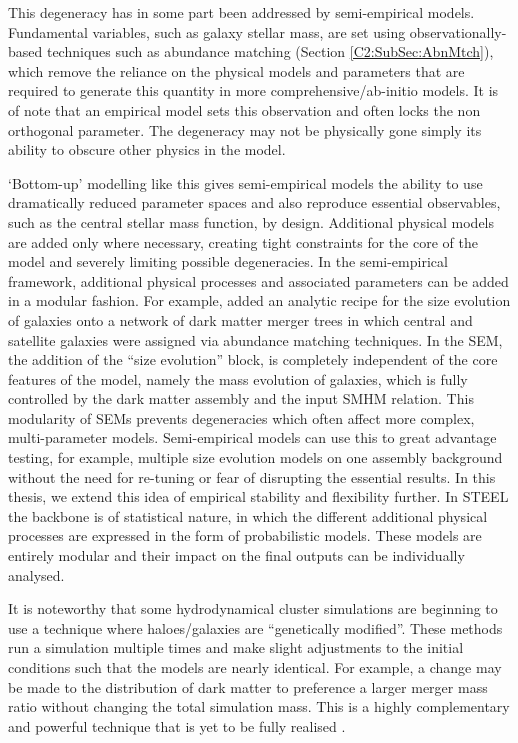 This degeneracy has in some part been addressed by semi-empirical models. Fundamental variables, such as galaxy stellar mass, are set using observationally-based techniques such as abundance matching (Section \ref{C2:SubSec:AbnMtch}), which remove the reliance on the physical models and parameters that are required to generate this quantity in more comprehensive/ab-initio models. It is of note that an empirical model sets this observation and often locks the non orthogonal parameter. The degeneracy may not be physically gone simply its ability to obscure other physics in the model.

`Bottom-up' modelling like this gives semi-empirical models the ability to use dramatically reduced parameter spaces and also reproduce essential observables, such as the central stellar mass function, by design. Additional physical models are added only where necessary, creating tight constraints for the core of the model and severely limiting possible degeneracies. In the semi-empirical framework, additional physical processes and associated parameters can be added in a modular fashion. For example, \citet{Shankar2014} added an analytic recipe for the size evolution of galaxies onto a network of dark matter merger trees in which central and satellite galaxies were assigned via abundance matching techniques. In the \citet{Shankar2014} SEM, the addition of the ``size evolution'' block, is completely independent of the core features of the model, namely the mass evolution of galaxies, which is fully controlled by the dark matter assembly and the input SMHM relation. This modularity of SEMs prevents degeneracies which often affect more complex, multi-parameter models. Semi-empirical models can use this to great advantage testing, for example, multiple size evolution models on one assembly background without the need for re-tuning or fear of disrupting the essential results. In this thesis, we extend this idea of empirical stability and flexibility further. In STEEL the backbone is of statistical nature, in which the different additional physical processes are expressed in the form of probabilistic models. These models are entirely modular and their impact on the final outputs can be individually analysed. 

It is noteworthy that some hydrodynamical cluster simulations are beginning to use a technique where haloes/galaxies are ``genetically modified''. These methods run a simulation multiple times and make slight adjustments to the initial conditions such that the models are nearly identical. For example, a change may be made to the distribution of dark matter to preference a larger merger mass ratio without changing the total simulation mass. This is a highly complementary and powerful technique that is yet to be fully realised \cite{Rey2018QuadraticHistory}.

